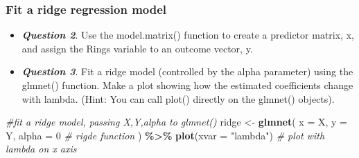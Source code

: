\documentclass[
]{article}
\newenvironment{Shaded}{\begin{snugshade}}{\end{snugshade}}
\newcommand{\AttributeTok}[1]{\textcolor[rgb]{0.13,0.29,0.53}{#1}}
\newcommand{\CommentTok}[1]{\textcolor[rgb]{0.56,0.35,0.01}{\textit{#1}}}
\newcommand{\DecValTok}[1]{\textcolor[rgb]{0.00,0.00,0.81}{#1}}
\newcommand{\FunctionTok}[1]{\textcolor[rgb]{0.13,0.29,0.53}{\textbf{#1}}}
\newcommand{\NormalTok}[1]{#1}
\newcommand{\OtherTok}[1]{\textcolor[rgb]{0.56,0.35,0.01}{#1}}
\newcommand{\SpecialCharTok}[1]{\textcolor[rgb]{0.81,0.36,0.00}{\textbf{#1}}}
\newcommand{\StringTok}[1]{\textcolor[rgb]{0.31,0.60,0.02}{#1}}
\providecommand{\tightlist}{%
  \setlength{\itemsep}{0pt}\setlength{\parskip}{0pt}}
\begin{document}
\hypertarget{fit-a-ridge-regression-model}{%
\subsubsection{Fit a ridge regression
model}\label{fit-a-ridge-regression-model}}

\begin{itemize}
\tightlist
\item
  \textbf{\emph{Question 2}}. Use the model.matrix() function to create
  a predictor matrix, x, and assign the Rings variable to an outcome
  vector, y.
\end{itemize}

\begin{Shaded}
\end{Shaded}

\begin{itemize}
\tightlist
\item
  \textbf{\emph{Question 3}}. Fit a ridge model (controlled by the alpha
  parameter) using the glmnet() function. Make a plot showing how the
  estimated coefficients change with lambda. (Hint: You can call plot()
  directly on the glmnet() objects).
\end{itemize}

\begin{Shaded}
\begin{Highlighting}[]
\CommentTok{\#fit a ridge model, passing X,Y,alpha to glmnet()}
\NormalTok{ridge }\OtherTok{\textless{}{-}} \FunctionTok{glmnet}\NormalTok{(}
  \AttributeTok{x =}\NormalTok{ X,}
  \AttributeTok{y =}\NormalTok{ Y,}
  \AttributeTok{alpha =} \DecValTok{0} \CommentTok{\# rigde function}
\NormalTok{) }\SpecialCharTok{\%\textgreater{}\%} 
  \FunctionTok{plot}\NormalTok{(}\AttributeTok{xvar =} \StringTok{"lambda"}\NormalTok{) }\CommentTok{\# plot with lambda on x axis}
\end{Highlighting}
\end{Shaded}
\end{document}
